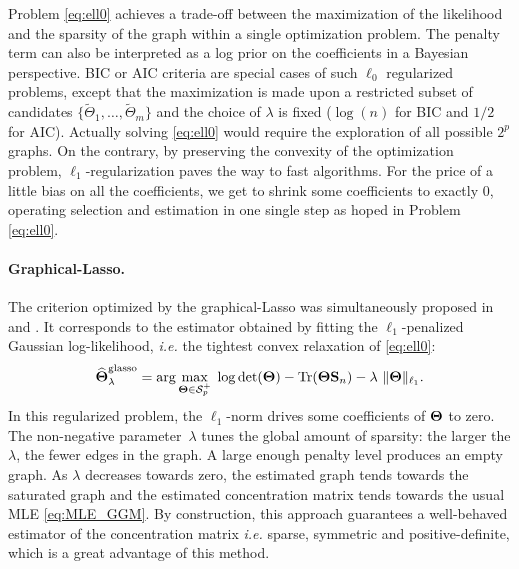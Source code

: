 Problem \eqref{eq:ell0} achieves a  trade-off between the maximization
of  the likelihood  and  the sparsity  of the  graph  within a  single
optimization problem.  The  penalty term can also be  interpreted as a
log prior  on the coefficients in  a Bayesian perspective. BIC  or AIC
criteria  are special  cases  of such  $\ell_0$ regularized  problems,
except  that the  maximization is  made  upon a  restricted subset  of
candidates  $\{\tilde{\Theta}_1,\dots,   \tilde{\Theta}_m\}$  and  the
choice of  $\lambda$ is fixed ($\log(n)$  for BIC and $1/2$  for AIC).
Actually solving \eqref{eq:ell0} would  require the exploration of all
possible $2^p$ graphs.   On the contrary, by  preserving the convexity
of the optimization problem,  $\ell_1$-regularization paves the way to
fast  algorithms.   For  the  price  of  a  little  bias  on  all  the
coefficients,  we  get  to  shrink some  coefficients  to  exactly  0,
operating  selection and  estimation in  one single  step as  hoped in
Problem \eqref{eq:ell0}.

\paragraph*{Graphical-Lasso.}    The   criterion  optimized   by   the
graphical-Lasso       was       simultaneously       proposed       in
\cite{2007_Biometrika_Yuan}    and   \cite{2008_JMLR_Banerjee}.     It
corresponds    to   the    estimator   obtained    by   fitting    the
$\ell_1$-penalized Gaussian  log-likelihood, \emph{i.e.}  the tightest
convex relaxation of \eqref{eq:ell0}:
\begin{equation}
  \label{eq:MLE_l1}
  \widehat{\boldsymbol\Theta}^{\text{glasso}}_\lambda = \arg \max_{\boldsymbol\Theta \in \mathcal{S}^+_p} \; \log
  \det(\boldsymbol\Theta) - \mathrm{Tr}(\boldsymbol\Theta \mathbf{S}_n) -
  \lambda\ \|\boldsymbol\Theta\|_{\ell_1}.
\end{equation}
In   this  regularized   problem,   the   $\ell_1$-norm  drives   some
coefficients    of    $\boldsymbol\Theta$    to    zero.     The    non-negative
parameter~$\lambda$ tunes  the global  amount of sparsity:  the larger
the $\lambda$,  the fewer edges in  the graph. A large  enough penalty
level produces an  empty graph.  As $\lambda$  decreases towards zero,
the  estimated  graph  tends  towards  the  saturated  graph  and  the
estimated   concentration  matrix   tends   towards   the  usual   MLE
\eqref{eq:MLE_GGM}.   By  construction,  this  approach  guarantees  a
well-behaved  estimator   of  the  concentration   matrix  \emph{i.e.}
sparse, symmetric and positive-definite, which is a great advantage of
this method.


